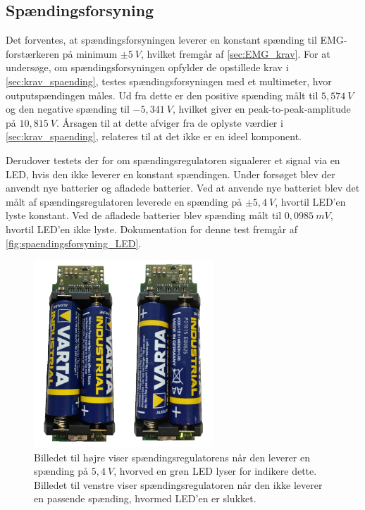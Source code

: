 \subsection{Spændingsforsyning} \label{test_spaendingsforsyning}
Det forventes, at spændingsforsyningen leverer en konstant spænding til EMG-forstærkeren på minimum $\pm 5~V$, hvilket fremgår af \autoref{sec:EMG_krav}. For at undersøge, om spændingsforsyningen opfylder de opstillede krav i \ref{sec:krav_spaending}, testes spændingsforsyningen med et multimeter, hvor outputspændingen måles. %
Ud fra dette er den positive spænding målt til $5,574~V$ og den negative spænding til $-5,341~V$, hvilket giver en peak-to-peak-amplitude på $10,815~V$. Årsagen til at dette afviger fra de oplyste værdier i \autoref{sec:krav_spaending}, relateres til at det ikke er en ideel komponent. 

%
Derudover testets der for om spændingsregulatoren signalerer et signal via en LED, hvis den ikke leverer en konstant spændingen. Under forsøget blev der anvendt nye batterier og afladede batterier. Ved at anvende nye batteriet blev det målt af spændingsregulatoren leverede en spænding på $\pm5,4~V$, hvortil LED'en lyste konstant. Ved de afladede batterier blev spænding målt til  $0,0985~mV$, hvortil LED'en ikke lyste. Dokumentation for denne test fremgår af \autoref{fig:spaendingsforsyning_LED}.


\begin{figure}[H]
\centering
\includegraphics[width=0.6\textwidth]{figures/bat_test}
\caption{Billedet til højre viser spændingsregulatorens når den leverer en spænding på $5,4~V$, hvorved en grøn LED lyser for indikere dette. Billedet til venstre viser spændingsregulatoren når den ikke leverer en passende spænding, hvormed LED'en er slukket.}
\label{fig:spaendingsforsyning_LED}
\end{figure}

